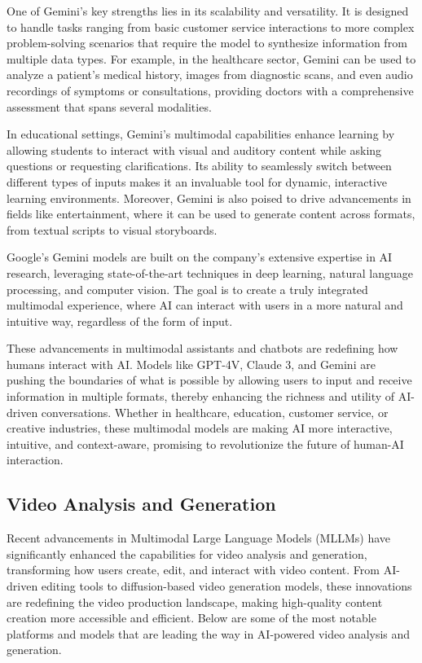 One of Gemini's key strengths lies in its scalability and versatility. 
It is designed to handle tasks ranging from basic customer service interactions to more complex problem-solving scenarios that require the model to synthesize information from multiple data types. 
For example, in the healthcare sector, Gemini can be used to analyze a patient's medical history, images from diagnostic scans, and even audio recordings of symptoms or consultations, providing doctors with a comprehensive assessment that spans several modalities.

In educational settings, Gemini's multimodal capabilities enhance learning by allowing students to interact with visual and auditory content while asking questions or requesting clarifications. 
Its ability to seamlessly switch between different types of inputs makes it an invaluable tool for dynamic, interactive learning environments. 
Moreover, Gemini is also poised to drive advancements in fields like entertainment, where it can be used to generate content across formats, from textual scripts to visual storyboards.

Google's Gemini models are built on the company's extensive expertise in AI research, leveraging state-of-the-art techniques in deep learning, natural language processing, and computer vision. 
The goal is to create a truly integrated multimodal experience, where AI can interact with users in a more natural and intuitive way, regardless of the form of input.

These advancements in multimodal assistants and chatbots are redefining how humans interact with AI. 
Models like GPT-4V, Claude 3, and Gemini are pushing the boundaries of what is possible by allowing users to input and receive information in multiple formats, thereby enhancing the richness and utility of AI-driven conversations. 
Whether in healthcare, education, customer service, or creative industries, these multimodal models are making AI more interactive, intuitive, and context-aware, promising to revolutionize the future of human-AI interaction.

\subsection{Video Analysis and Generation}

Recent advancements in Multimodal Large Language Models (MLLMs) have significantly enhanced the capabilities for video analysis and generation, transforming how users create, edit, and interact with video content. 
From AI-driven editing tools to diffusion-based video generation models, these innovations are redefining the video production landscape, making high-quality content creation more accessible and efficient. 
Below are some of the most notable platforms and models that are leading the way in AI-powered video analysis and generation.

